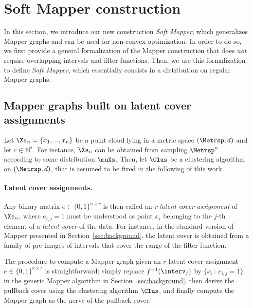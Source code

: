 \section{Soft Mapper construction}\label{sec:soft_mapper}

In this section, we introduce our new construction {\em Soft Mapper}, which generalizes Mapper graphs and can be used for non-convex optimization.
In order to do so, we first
provide a
general formalization of the Mapper construction that 
does {\em not} require
overlapping intervals and filter functions. 
Then, we use this formalization to 
define \emph{Soft Mapper}, which essentially consists in a distribution on regular Mapper graphs. 

\subsection{Mapper graphs built on latent cover assignments}

Let $\Xs_n=\{x_1,...,x_n\}$ be a point cloud lying in a metric space $(\Metrsp,d)$ and let $r \in \mathbb N^\star$. 
For instance, $\Xs_n$  can be obtained from sampling $\Metrsp^n$ according to some distribution $\muXs$.
Then, let $\Clus$ be a clustering algorithm on $(\Metrsp,d)$, that is assumed to be fixed in the following of this work.

\paragraph*{Latent cover assignments.} Any binary matrix $e \in {\{0,1\}}^{n\times r}$ is then called an \emph{r-latent cover assignment} of $\Xs_n$, where $e_{i,j}=1$ must be understood as point $x_i$ belonging to the $j$-th element of a \emph{latent cover} of the data.  For instance, in the standard version of Mapper presented in Section~\ref{sec:background}, the latent cover is obtained from a family of pre-images of intervals that cover the range of the filter function.

The procedure to compute a Mapper graph given an $r$-latent cover assignment 
$e \in {\{0,1\}}^{n\times r}$
is straightforward: simply replace $f^{-1}(\interv_j)$ by $\{x_i\,:\,e_{i,j}=1\}$ in the generic Mapper algorithm in Section~\ref{sec:background}, then derive the pullback cover using the clustering algorithm $\Clus$, and finally compute the Mapper graph as the nerve of the pullback cover.


